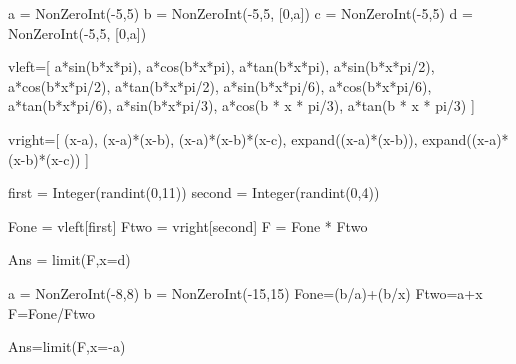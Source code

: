 \begin{sagesilent}
a = NonZeroInt(-5,5)
b = NonZeroInt(-5,5, [0,a])
c = NonZeroInt(-5,5)
d = NonZeroInt(-5,5, [0,a])
   
vleft=[
   a*sin(b*x*pi), 
   a*cos(b*x*pi), 
   a*tan(b*x*pi), 
   a*sin(b*x*pi/2), 
   a*cos(b*x*pi/2), 
   a*tan(b*x*pi/2), 
   a*sin(b*x*pi/6), 
   a*cos(b*x*pi/6), 
   a*tan(b*x*pi/6), 
   a*sin(b*x*pi/3), 
   a*cos(b * x * pi/3), 
   a*tan(b * x * pi/3)
]

vright=[
   (x-a),
   (x-a)*(x-b),
   (x-a)*(x-b)*(x-c),
   expand((x-a)*(x-b)),
   expand((x-a)*(x-b)*(x-c))
]

first = Integer(randint(0,11))
second = Integer(randint(0,4))

Fone = vleft[first]
Ftwo = vright[second]
F = Fone * Ftwo

Ans = limit(F,x=d)

\end{sagesilent}


\begin{sagesilent}
a = NonZeroInt(-8,8)
b = NonZeroInt(-15,15)
Fone=(b/a)+(b/x)
Ftwo=a+x
F=Fone/Ftwo

Ans=limit(F,x=-a)
\end{sagesilent}



